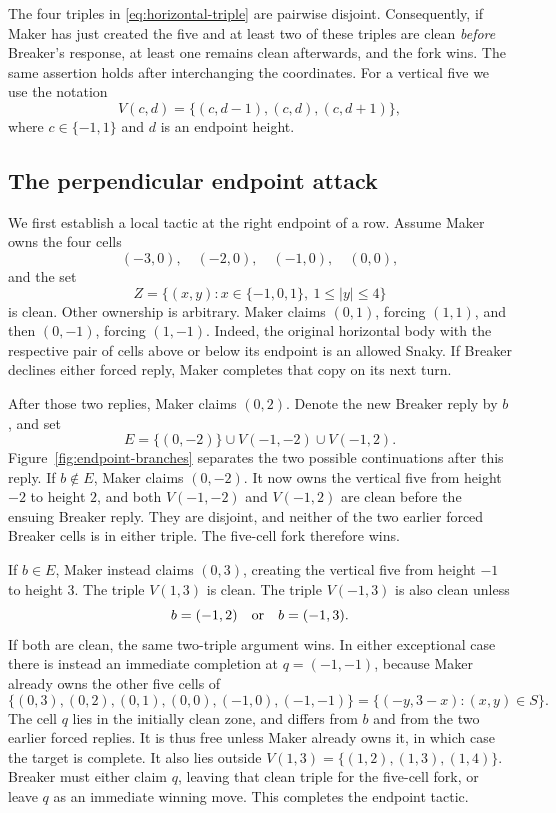 The four triples in \eqref{eq:horizontal-triple} are pairwise
disjoint. Consequently, if Maker has just created the five and
at least two of these triples are clean \emph{before} Breaker's
response, at least one remains clean afterwards, and the fork
wins. The same assertion holds after interchanging the coordinates.
For a vertical five we use the notation
\[
 V(c,d)=\{(c,d-1),(c,d),(c,d+1)\},
\]
where $c\in\{-1,1\}$ and $d$ is an endpoint height.

\subsection{The perpendicular endpoint attack}

We first establish a local tactic at the right endpoint of a row.
Assume Maker owns the four cells
\[
 (-3,0),\quad(-2,0),\quad(-1,0),\quad(0,0),
\]
and the set
\begin{equation}\label{eq:endpoint-zone}
 Z=\{(x,y):x\in\{-1,0,1\},\ 1\le |y|\le4\}
\end{equation}
is clean. Other ownership is arbitrary.
Maker claims $(0,1)$, forcing $(1,1)$, and then $(0,-1)$,
forcing $(1,-1)$. Indeed, the original horizontal body with the
respective pair of cells above or below its endpoint is an allowed
Snaky. If Breaker declines either forced reply, Maker completes
that copy on its next turn.

After those two replies, Maker claims $(0,2)$. Denote the new
Breaker reply by $b$, and set
\[
E=\{(0,-2)\}\cup V(-1,-2)\cup V(-1,2).
\]
Figure~\ref{fig:endpoint-branches} separates the two possible
continuations after this reply.
If $b\notin E$, Maker claims $(0,-2)$. It now owns the vertical
five from height $-2$ to height $2$, and both $V(-1,-2)$ and
$V(-1,2)$ are clean before the ensuing Breaker reply. They are
disjoint, and neither of the two earlier forced Breaker cells is
in either triple. The five-cell fork therefore wins.

If $b\in E$, Maker instead claims $(0,3)$, creating the vertical
five from height $-1$ to height $3$. The triple $V(1,3)$ is clean.
The triple $V(-1,3)$ is also clean unless
\[
 b=(-1,2)\quad\hbox{or}\quad b=(-1,3).
\]
If both are clean, the same two-triple argument wins.
In either exceptional case there is instead an immediate
completion at $q=(-1,-1)$, because Maker already owns the other
five cells of
\begin{equation}\label{eq:perpendicular-copy}
 \{(0,3),(0,2),(0,1),(0,0),(-1,0),(-1,-1)\}
 =\{(-y,3-x):(x,y)\in S\}.
\end{equation}
The cell $q$ lies in the initially clean zone, and differs from
$b$ and from the two earlier forced replies. It is thus free
unless Maker already owns it, in which case the target is complete.
It also lies outside $V(1,3)=\{(1,2),(1,3),(1,4)\}$.
Breaker must either claim $q$, leaving that clean triple for the
five-cell fork, or leave $q$ as an immediate winning move.
This completes the endpoint tactic.

